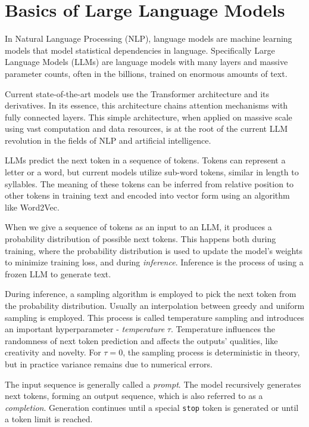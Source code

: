 \section{Basics of Large Language Models}
In Natural Language Processing (NLP), language models are machine learning models that model statistical dependencies in language.
Specifically Large Language Models (LLMs) are language models with many layers and massive parameter counts, often in the billions, trained on enormous amounts of text.

Current state-of-the-art models use the Transformer\cite{vaswani2023attentionneed} architecture and its derivatives. 
In its essence, this architecture chains attention mechanisms with fully connected layers. 
This simple architecture, when applied on massive scale using vast computation and data resources, is at the root of the current LLM revolution in the fields of NLP and artificial intelligence.

LLMs predict the next token in a sequence of tokens. Tokens can represent a letter or a word, but current models utilize sub-word tokens, similar in length to syllables.
The meaning of these tokens can be inferred from relative position to other tokens in training text and encoded into vector form using an algorithm like Word2Vec\cite{mikolov2013efficientestimationwordrepresentations}.

When we give a sequence of tokens as an input to an LLM, it produces a probability distribution of possible next tokens. 
This happens both during training, where the probability distribution is used to update the model's weights to minimize training loss, and during \textit{inference}.
Inference is the process of using a frozen LLM to generate text. 

During inference, a sampling algorithm is employed to pick the next token from the probability distribution.
Usually an interpolation between greedy and uniform sampling is employed. This process is called temperature sampling and introduces an important hyperparameter - \textit{temperature} $\tau$.
Temperature influences the randomness of next token prediction and affects the outputs' qualities, like creativity and novelty. 
For $\tau = 0$, the sampling process is deterministic in theory, but in practice variance remains due to numerical errors.

The input sequence is generally called a \textit{prompt}. The model recursively generates next tokens, forming an output sequence, which is also referred to as a \textit{completion}.
Generation continues until a special \texttt{stop} token is generated or until a token limit is reached.

